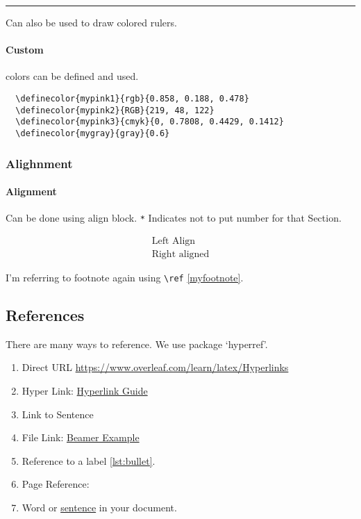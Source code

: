 \documentclass{report}[a4paper,12pt] %
\begin{document}
{\color{RubineRed} \rule{\linewidth}{0.5mm}}
Can also be used to draw colored rulers. 

\paragraph{Custom} colors can be defined and \textcolor{mypink2}{used}.

\begin{verbatim}
  \definecolor{mypink1}{rgb}{0.858, 0.188, 0.478}
  \definecolor{mypink2}{RGB}{219, 48, 122}
  \definecolor{mypink3}{cmyk}{0, 0.7808, 0.4429, 0.1412}
  \definecolor{mygray}{gray}{0.6}
\end{verbatim}

\subsubsection{Alighnment}
\paragraph{Alignment} Can be done using align block. 
\verb|*| Indicates not to put number for that Section.

\begin{align*}
  \text{Left Align}\\
  \text{Right aligned}
\end{align*}

I'm referring to footnote again using \verb|\ref| \ref{myfootnote}.

\subsection{References}
There are many ways to reference. We use package `hyperref'.
\begin{enumerate}
  \item Direct URL \url{https://www.overleaf.com/learn/latex/Hyperlinks}
  \item Hyper Link: \href{https://www.overleaf.com/learn/latex/Hyperlinks}{Hyperlink Guide}
  \item Link to Sentence
  \item File Link: \href{run:../../presentation/beamer/tutorial.tex}{Beamer Example}
  \item Reference to a label \ref{lst:bullet}.
  \item Page Reference: \pageref{fig:coffee}
  \item Word or \hyperlink{sen:formatopts}{sentence} in your document.
\end{enumerate}
\end{document}
